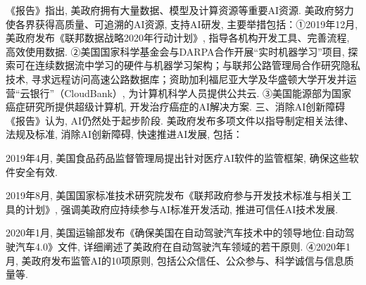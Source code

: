 《报告》指出, 美政府拥有大量数据、模型及计算资源等重要AI资源. 美政府努力使各界获得高质量、可追溯的AI资源, 支持AI研发, 主要举措包括：①2019年12月, 美政府发布《联邦数据战略2020年行动计划》, 指导各机构开发工具、完善流程, 高效使用数据. ②美国国家科学基金会与DARPA合作开展“实时机器学习”项目, 探索可在连续数据流中学习的硬件与机器学习架构；与联邦公路管理局合作研究隐私技术, 寻求远程访问高速公路数据库；资助加利福尼亚大学及华盛顿大学开发并运营“云银行”（CloudBank）, 为计算机科学人员提供公共云. ③美国能源部为国家癌症研究所提供超级计算机, 开发治疗癌症的AI解决方案. 三、消除AI创新障碍《报告》认为, AI仍然处于起步阶段. 美政府发布多项文件以指导制定相关法律、法规及标准, 消除AI创新障碍, 快速推进AI发展, 包括：

 2019年4月, 美国食品药品监督管理局提出针对医疗AI软件的监管框架, 确保这些软件安全有效.

 2019年8月, 美国国家标准技术研究院发布《联邦政府参与开发技术标准与相关工具的计划》, 强调美政府应持续参与AI标准开发活动, 推进可信任AI技术发展.

 2020年1月, 美国运输部发布《确保美国在自动驾驶汽车技术中的领导地位:自动驾驶汽车4.0》文件, 详细阐述了美政府在自动驾驶汽车领域的若干原则. ④2020年1月, 美政府发布监管AI的10项原则, 包括公众信任、公众参与、科学诚信与信息质量等.
%
%

